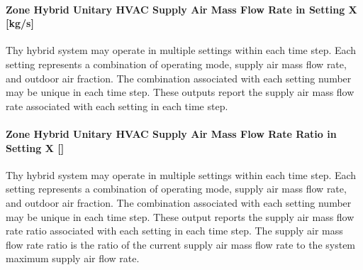 \paragraph{Zone Hybrid Unitary HVAC Supply Air Mass Flow Rate in Setting X [kg/s]}
Thy hybrid system may operate in multiple settings within each time step. Each setting represents a combination of operating mode, supply air mass flow rate, and outdoor air fraction. The combination associated with each setting number may be unique in each time step. These outputs report the supply air mass flow rate associated with each setting in each time step.

\paragraph{Zone Hybrid Unitary HVAC Supply Air Mass Flow Rate Ratio in Setting X []}
Thy hybrid system may operate in multiple settings within each time step. Each setting represents a combination of operating mode, supply air mass flow rate, and outdoor air fraction. The combination associated with each setting number may be unique in each time step. These output reports the supply air mass flow rate ratio associated with each setting in each time step. The supply air mass flow rate ratio is the ratio of the current supply air mass flow rate to the system maximum supply air flow rate.
